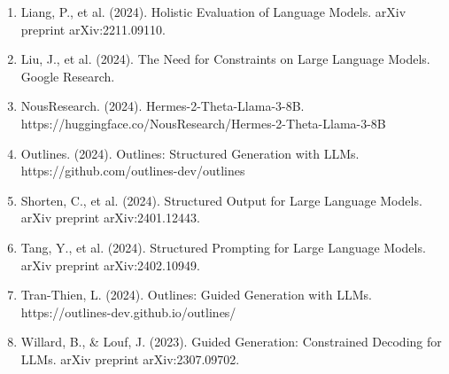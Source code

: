 \documentclass{article}
\begin{document}
\begin{enumerate}
    \item Liang, P., et al. (2024). Holistic Evaluation of Language Models. arXiv preprint arXiv:2211.09110.
    \item Liu, J., et al. (2024). The Need for Constraints on Large Language Models. Google Research.
    \item NousResearch. (2024). Hermes-2-Theta-Llama-3-8B. https://huggingface.co/NousResearch/Hermes-2-Theta-Llama-3-8B
    \item Outlines. (2024). Outlines: Structured Generation with LLMs. https://github.com/outlines-dev/outlines
    \item Shorten, C., et al. (2024). Structured Output for Large Language Models. arXiv preprint arXiv:2401.12443.
    \item Tang, Y., et al. (2024). Structured Prompting for Large Language Models. arXiv preprint arXiv:2402.10949.
    \item Tran-Thien, L. (2024). Outlines: Guided Generation with LLMs. https://outlines-dev.github.io/outlines/
    \item Willard, B., & Louf, J. (2023). Guided Generation: Constrained Decoding for LLMs. arXiv preprint arXiv:2307.09702.
\end{enumerate}
\end{document}
